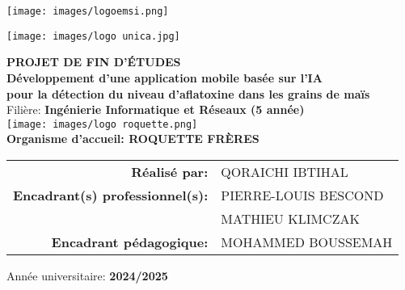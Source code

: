 \documentclass[12pt,a4paper]{report}
\begin{document}
\thispagestyle{empty} %

\begin{center}

\begin{minipage}{0.45\textwidth}\centering
  \texttt{[image: images/logoemsi.png]}
\end{minipage}\hfill
\begin{minipage}{0.45\textwidth}\centering
  \texttt{[image: images/logo unica.jpg]}
\end{minipage}

\vspace{1cm}

{\Large \textbf{PROJET DE FIN D'ÉTUDES}}\\[0.5cm]

{\Large \textbf{Développement d’une application mobile basée sur l’IA \\
pour la détection du niveau d’aflatoxine dans les grains de maïs}}\\[1cm]

{\large Filière: \textbf{Ingénierie Informatique et Réseaux (5\ieme{} année)}}\\[1.2cm]

\texttt{[image: images/logo roquette.png]}\\[0.4cm]

{\large \textbf{Organisme d’accueil: ROQUETTE FRÈRES}}\\[1.5cm]

\begin{tabular}{@{}>{\bfseries}r l@{}}
  Réalisé par:& QORAICHI IBTIHAL \\
  Encadrant(s) professionnel(s):& PIERRE-LOUIS BESCOND \\
                                  & MATHIEU KLIMCZAK \\
  Encadrant pédagogique:& MOHAMMED BOUSSEMAH \\
\end{tabular}

\vfill
{\large Année universitaire: \textbf{2024/2025}}

\end{center}
\clearpage
\thispagestyle{empty}
\end{document}
